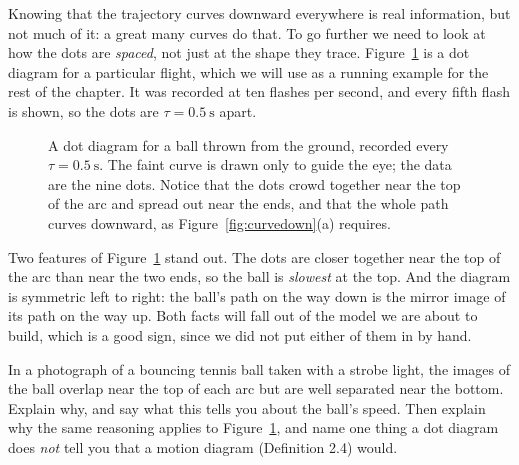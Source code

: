 \documentclass[11pt,twoside,openany]{book}
\newcounter{check}[chapter]
\begin{document}
Knowing that the trajectory curves downward everywhere is real information, but not much of it: a great many curves do that. To go further we need to look at how the dots are \emph{spaced}, not just at the shape they trace. Figure~\ref{fig:dotdiag} is a dot diagram for a particular flight, which we will use as a running example for the rest of the chapter. It was recorded at ten flashes per second, and every fifth flash is shown, so the dots are $\tau = \SI{0.5}{\second}$ apart.

\begin{figure}[htb]
\centering
{}
\caption{A dot diagram for a ball thrown from the ground, recorded every $\tau = \SI{0.5}{\second}$. The faint curve is drawn only to guide the eye; the data are the nine dots. Notice that the dots crowd together near the top of the arc and spread out near the ends, and that the whole path curves downward, as Figure~\ref{fig:curvedown}(a) requires.}
\label{fig:dotdiag}
\end{figure}

Two features of Figure~\ref{fig:dotdiag} stand out. The dots are closer together near the top of the arc than near the two ends, so the ball is \emph{slowest} at the top. And the diagram is symmetric left to right: the ball's path on the way down is the mirror image of its path on the way up. Both facts will fall out of the model we are about to build, which is a good sign, since we did not put either of them in by hand.

\begin{checkbox}
In a photograph of a bouncing tennis ball taken with a strobe light, the images of the ball overlap near the top of each arc but are well separated near the bottom. Explain why, and say what this tells you about the ball's speed. Then explain why the same reasoning applies to Figure~\ref{fig:dotdiag}, and name one thing a dot diagram does \emph{not} tell you that a motion diagram (Definition 2.4) would.
\end{checkbox}
\end{document}

